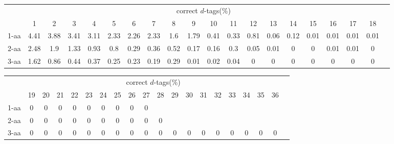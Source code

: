 \documentclass{article}
\begin{document}
\begin{table}[h]\tiny
\vspace{3mm}
{\centering
\begin{center}
\begin{tabular}{|l|c|c|c|c|c|c|c|c|c|c|c|c|c|c|c|c|c|c|c|}
  \hline
  & \multicolumn{ 18 }{|c|}{correct $d$-tags(\%)} \\
  \cline{2- 19}
    & 1 & 2 & 3 & 4 & 5 & 6 & 7 & 8 & 9 & 10 & 11 & 12 & 13 & 14 & 15 & 16 & 17 & 18\\
  \hline
1-aa  & 4.41 & 3.88 & 3.41 & 3.11 & 2.33 & 2.26 & 2.33 & 1.6 & 1.79 & 0.41 & 0.33 & 0.81 & 0.06 & 0.12 & 0.01 & 0.01 & 0.01 & 0.01\\
2-aa  & 2.48 & 1.9 & 1.33 & 0.93 & 0.8 & 0.29 & 0.36 & 0.52 & 0.17 & 0.16 & 0.3 & 0.05 & 0.01 & 0 & 0 & 0.01 & 0.01 & 0\\
3-aa  & 1.62 & 0.86 & 0.44 & 0.37 & 0.25 & 0.23 & 0.19 & 0.29 & 0.01 & 0.02 & 0.04 & 0 & 0 & 0 & 0 & 0 & 0 & 0\\
 \hline
\end{tabular}
\end{center}
\par}
\centering

\vspace{3mm}
\label{table:correct-d-tags}
\end{table}
\begin{table}[h]\tiny
\vspace{3mm}
{\centering
\begin{center}
\begin{tabular}{|l|c|c|c|c|c|c|c|c|c|c|c|c|c|c|c|c|c|c|c|}
  \hline
  & \multicolumn{ 18 }{|c|}{correct $d$-tags(\%)} \\
  \cline{2- 19}
    & 19 & 20 & 21 & 22 & 23 & 24 & 25 & 26 & 27 & 28 & 29 & 30 & 31 & 32 & 33 & 34 & 35 & 36\\
  \hline
1-aa  & 0 & 0 & 0 & 0 & 0 & 0 & 0 & 0 & 0 &  &  &  &  &  &  &  &  & \\
2-aa  & 0 & 0 & 0 & 0 & 0 & 0 & 0 & 0 & 0 & 0 &  &  &  &  &  &  &  & \\
3-aa  & 0 & 0 & 0 & 0 & 0 & 0 & 0 & 0 & 0 & 0 & 0 & 0 & 0 & 0 & 0 & 0 & 0 & 0\\
 \hline
\end{tabular}
\end{center}
\par}
\centering

\vspace{3mm}
\label{table:correct-d-tags}
\end{table}
\end{document}
